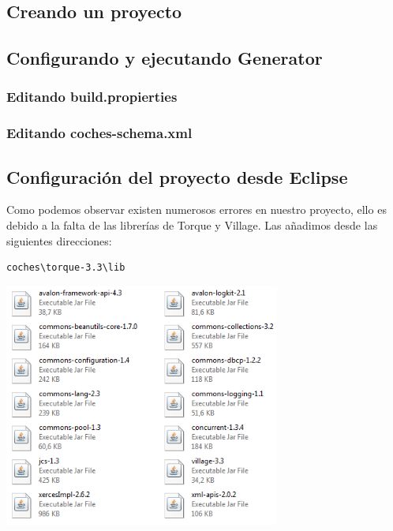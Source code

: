 \documentclass[12pt, oneside]{article}
\begin{document}
	\subsection{Creando un proyecto}
		

	\subsection{Configurando y ejecutando Generator}
		

		\subsubsection{Editando build.propierties}
			

		\subsubsection{Editando coches-schema.xml}
			

	\subsection{Configuración del proyecto desde Eclipse}
Como podemos observar existen numerosos errores en nuestro proyecto, ello es debido a la falta de las librerías de Torque y Village. Las añadimos desde las siguientes direcciones:

\begin{lstlisting}
coches\torque-3.3\lib
\end{lstlisting}

	\begin{center}
		\includegraphics[height=8cm]{img/torque-lib.png}
	\end{center}
	
\end{document}
